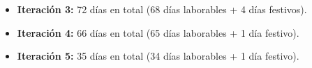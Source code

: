 \documentclass[12pt,a4paper, twoside]{report}
\begin{document}
\begin{itemize}
		\item \textbf{Iteración 3:} 72 días en total (68 días laborables + 4 días festivos).
		
%		
		
		\item \textbf{Iteración 4:} 66 días en total (65 días laborables + 1 día festivo).
		
%		

		\newpage
		\item \textbf{Iteración 5:} 35 días en total (34 días laborables + 1 día festivo).
		

\end{itemize}
\end{document}
